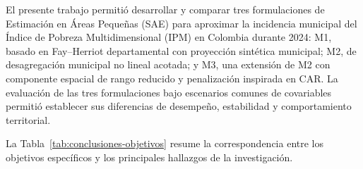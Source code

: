 \label{sec:conclusion}

El presente trabajo permitió desarrollar y comparar tres formulaciones de Estimación en Áreas Pequeñas (SAE) para aproximar la incidencia municipal del Índice de Pobreza Multidimensional (IPM) en Colombia durante 2024: M1, basado en Fay--Herriot departamental con proyección sintética municipal; M2, de desagregación municipal no lineal acotada; y M3, una extensión de M2 con componente espacial de rango reducido y penalización inspirada en CAR. La evaluación de las tres formulaciones bajo escenarios comunes de covariables permitió establecer sus diferencias de desempeño, estabilidad y comportamiento territorial.

La Tabla~\ref{tab:conclusiones-objetivos} resume la correspondencia entre los objetivos específicos y los principales hallazgos de la investigación.

